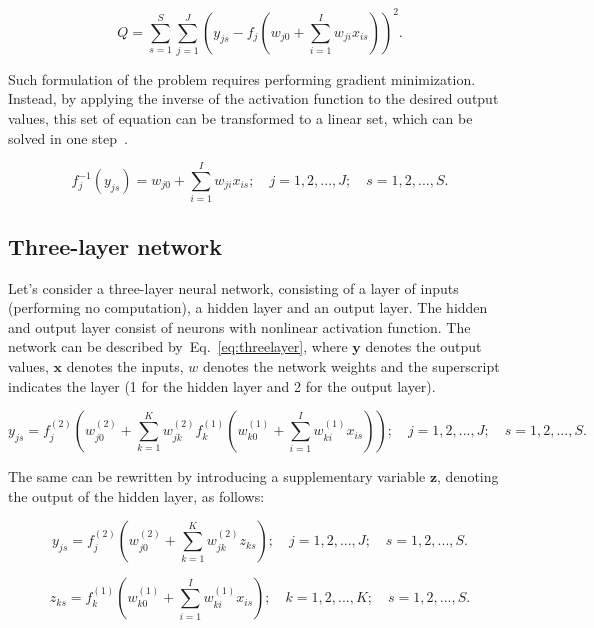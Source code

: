 \documentclass[]{spie}  %
\newcommand{\bm}[1]{\boldsymbol{#1}}
\begin{document}
\begin{equation}
Q = \sum_{s=1}^{S} \sum_{j=1}^{J} \left( y_{js} - f_j \left( w_{j0} + \sum_{i=1}^{I}w_{ji}x_{is} \right)\right)^{2}.
\label{eq:cstonelayerq}
\end{equation}

Such formulation of the problem requires performing gradient minimization. Instead, by applying the inverse of the activation function to the desired output values, this set of equation can be transformed to a linear set, which can be solved in one step~\cite{castillo2002global}.

\begin{equation}
f^{-1}_j(y_{js}) =  w_{j0} + \sum_{i=1}^{I}w_{ji}x_{is}; \quad j = 1,2,...,J; \quad s = 1,2,...,S.
\label{eq:cstonelayerinv}
\end{equation}

\subsection{Three-layer network}
Let's consider a three-layer neural network, consisting of a layer of inputs (performing no computation), a hidden layer and an output layer. The hidden and output layer consist of neurons with nonlinear activation function. The network can be described by~Eq.~\ref{eq:threelayer}, where $\bm{y}$ denotes the output values, $\bm{x}$ denotes the inputs, ${w}$ denotes the network weights and the superscript indicates the layer (1 for the hidden layer and 2 for the output layer).

\begin{equation}
y_{js} = f^{(2)}_j \left( w^{(2)}_{j0} + \sum_{k=1}^{K} w^{(2)}_{jk} f^{(1)}_k \left( w^{(1)}_{k0} + \sum_{i=1}^{I}w^{(1)}_{ki}x_{is} \right)\right); \quad j = 1,2,...,J; \quad s = 1,2,...,S.
\label{eq:threelayer}
\end{equation}

\noindent The same can be rewritten by introducing a supplementary variable $\bm{z}$, denoting the output of the hidden layer, as follows:

\begin{equation}
y_{js} = f^{(2)}_j \left( w^{(2)}_{j0} + \sum_{k=1}^{K} w^{(2)}_{jk} z_{ks}\right); \quad j = 1,2,...,J; \quad s = 1,2,...,S.
\label{eq:threelayer2}
\end{equation}

\begin{equation}
z_{ks} = f^{(1)}_k \left( w^{(1)}_{k0} + \sum_{i=1}^{I}w^{(1)}_{ki}x_{is} \right); \quad k = 1,2,...,K; \quad s = 1,2,...,S.
\label{eq:threelayer1}
\end{equation}
\end{document}
